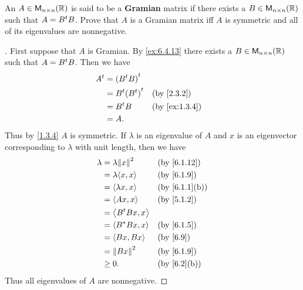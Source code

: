 \begin{ex}\label{ex:6.4.13}
	An \(A \in \mathsf{M}_{{n} \times n}({\mathbb{R}})\) is said to be a \textbf{Gramian} matrix if there exists a \(B \in \mathsf{M}_{{n} \times n}({\mathbb{R}})\) such that \(A = {B}^{t} B\).
	Prove that \(A\) is a Gramian matrix iff \(A\) is symmetric and all of its eigenvalues are nonnegative.
\end{ex}

\begin{proof}[]
	First suppose that \(A\) is Gramian.
	By \cref{ex:6.4.13} there exists a \(B \in \mathsf{M}_{{n} \times n}({\mathbb{R}})\) such that \(A = {B}^{t} B\).
	Then we have
	\begin{align*}
		\tp{A} & = \tp{(\tp{B} B)}                         \\
		       & = \tp{B} \tp{(\tp{B})} &  & \by{2.3.2}    \\
		       & = \tp{B} B             &  & \by{ex:1.3.4} \\
		       & = A.
	\end{align*}
	Thus by \cref{1.3.4} \(A\) is symmetric.
	If \(\lambda\) is an eigenvalue of \(A\) and \(x\) is an eigenvector corresponding to \(\lambda\) with unit length, then we have
	\begin{align*}
		\lambda & = \lambda \norm{x}^2  &  & \by{6.1.12}   \\
		        & = \lambda \inn{x, x}  &  & \by{6.1.9}    \\
		        & = \inn{\lambda x, x}  &  & \by{6.1.1}[b] \\
		        & = \inn{Ax, x}         &  & \by{5.1.2}    \\
		        & = \inn{\tp{B} B x, x}                    \\
		        & = \inn{B^* B x, x}    &  & \by{6.1.5}    \\
		        & = \inn{Bx, Bx}        &  & \by{6.9}      \\
		        & = \norm{Bx}^2         &  & \by{6.1.9}    \\
		        & \geq 0.               &  & \by{6.2}[b]
	\end{align*}
	Thus all eigenvalues of \(A\) are nonnegative.


\end{proof}
